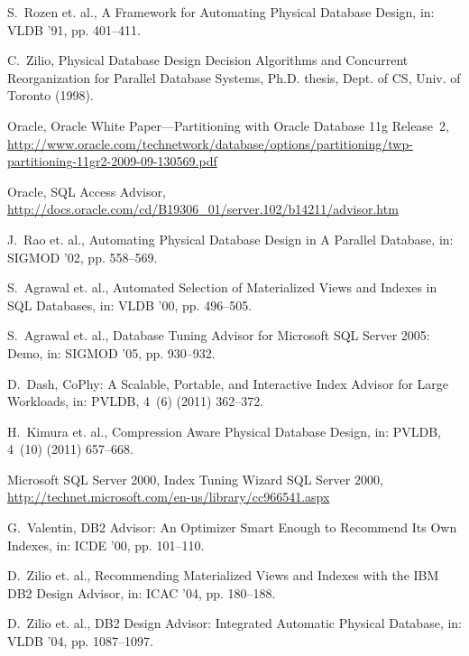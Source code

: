 \documentclass[paper]{ieice}
\begin{document}
\begin{thebibliography}{99}
{
{S.~Rozen et. al.}, {A Framework for Automating Physical
  Database Design}, in: VLDB '91, pp. 401--411.

{C.~Zilio}, {Physical Database Design Decision Algorithms and Concurrent
  \hbox{Reorganization} for Parallel Database Systems}, Ph.D. thesis,
  Dept. of CS, Univ. of Toronto (1998).

{Oracle}, {Oracle White Paper---Partitioning with \hbox{Oracle} Database 11g
  \hbox{Release 2}},
  \url{http://www.oracle.com/technetw}\linebreak\url{ork/database/options/partitioning/twp-partitioning}\linebreak\url{-11gr2-2009-09-130569.pdf}

{Oracle}, {SQL Access Advisor},
  \url{http://docs.oracle.com/cd/B19306_01/server.102/b14211/advisor.htm}

{J.~Rao et. al.}, {Automating
  Physical Database Design in A Parallel Database}, in: SIGMOD '02, pp. 558--569.

{S.~Agrawal et. al.}, {Automated Selection of Materialized Views and Indexes in SQL Databases}, in:
  {VLDB '00}, pp. 496--505.

{S.~Agrawal et. al.}, {Database Tuning Advisor for Microsoft
  SQL Server 2005: Demo}, in: SIGMOD '05, pp. 930--932.

{D.~Dash}, {CoPhy: A
  Scalable, Portable, and Interactive Index Advisor for Large Workloads},
  in: PVLDB, 4~(6) (2011) 362--372.

{H.~Kimura et. al.}, {Compression Aware
  \hbox{Physical} Database Design}, in: PVLDB, 4~(10) (2011) 657--668.

{Microsoft SQL Server 2000}, {Index Tuning Wizard SQL Server 2000},
  \url{http://technet.microsoft.com/en-us/library/cc966541.aspx} 

{G.~Valentin}, {DB2 Advisor: An Optimizer Smart Enough to Recommend Its Own
  Indexes}, in: {ICDE '00}, pp. 101--110.

{D.~Zilio et. al.},
  {Recommending Materialized Views and Indexes with the IBM DB2 Design
  Advisor}, in: ICAC '04, pp. 180--188.

{D.~Zilio et. al.}, {DB2 Design Advisor:
  Integrated Automatic Physical Database}, in: VLDB '04, pp. 1087--1097.

}
\end{thebibliography}
\end{document}
